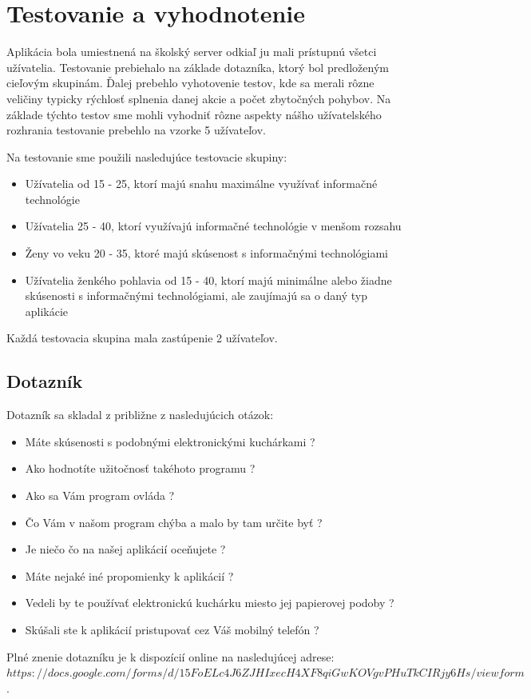 \documentclass[12pt,a4paper,titlepage,final]{article}
\begin{document}
\section{Testovanie a vyhodnotenie}
Aplikácia bola umiestnená na školský server odkiaľ ju mali prístupnú všetci užívatelia. Testovanie prebiehalo na základe dotazníka, ktorý bol predloženým cieľovým skupinám. Ďalej prebehlo vyhotovenie testov, kde sa merali rôzne veličiny typicky rýchlosť splnenia danej akcie a počet zbytočných pohybov. Na základe týchto testov sme mohli vyhodniť rôzne aspekty nášho užívatelského rozhrania testovanie prebehlo na vzorke 5 užívateľov. 

Na testovanie sme použili nasledujúce testovacie skupiny:
\begin{itemize}
\item Užívatelia od 15 - 25, ktorí majú snahu maximálne využívať informačné technológie
\item Užívatelia 25 - 40, ktorí využívajú informačné technológie v menšom rozsahu
\item Ženy vo veku 20 - 35, ktoré majú skúsenost s informačnými technológiami
\item Užívatelia ženkého pohlavia od 15 - 40, ktorí majú minimálne alebo žiadne skúsenosti s informačnými technológiami, ale zaujímajú sa o daný typ aplikácie
\end{itemize}
Každá testovacia skupina mala zastúpenie 2 užívateľov.

\subsection{Dotazník}
Dotazník sa skladal z približne z nasledujúcich otázok:
\begin{itemize}
\item Máte skúsenosti s podobnými elektronickými kuchárkami ?
\item Ako hodnotíte užitočnosť takéhoto programu ?
\item Ako sa Vám program ovláda ?
\item Čo Vám v našom program chýba a malo by tam určite byť ?
\item Je niečo čo na našej aplikácií oceňujete ?
\item Máte nejaké iné propomienky k aplikácií ?
\item Vedeli by te používať elektronickú kuchárku miesto jej papierovej podoby ?
\item Skúšali ste k aplikácií pristupovať cez Váš mobilný telefón ?


\end{itemize}
Plné znenie dotazníku je k dispozícií online na nasledujúcej adrese:$https://docs.google.com/forms/d/15FoELc4J6ZJHIxecH4XF8qiGwKOVgvPHuTkCIRjy6Hs/viewform$. 
\end{document}
